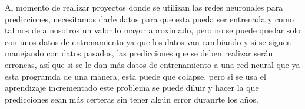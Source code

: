 Al momento de realizar proyectos donde se utilizan las redes neuronales para predicciones, necesitamos darle datos para que esta pueda ser entrenada y como tal nos de a nosotros un  valor lo mayor aproximado, pero no se puede quedar solo con unos datos de entrenamiento
ya que los datos van cambiando y si se siguen manejando con datos pasados, las predicciones que se deben realizar ser\'an erroneas, as\'i que si se le dan m\'as datos de entrenamiento a una red neural que ya esta programda de una manera, esta puede que colapse, pero si se
usa el aprendizaje incrementado este problema se puede diluir y hacer la que predicciones sean m\'as certeras sin tener alg\'un error duranrte los años.